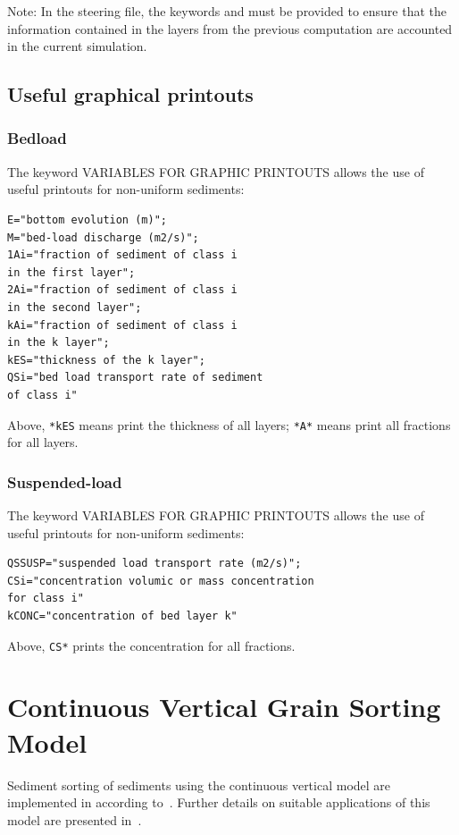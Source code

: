 \begin{WarningBlock}{Note:}
In the \sisyphe steering file, the keywords  and  must be provided
to ensure that the information contained in the layers from the previous computation are accounted in the current simulation.
\end{WarningBlock}
  


\subsection{Useful graphical printouts}
\subsubsection{Bedload}
The keyword {\ttfamily VARIABLES FOR GRAPHIC PRINTOUTS} allows the use of useful printouts for non-uniform sediments:
\begin{lstlisting}[frame=trBL]   
E="bottom evolution (m)";
M="bed-load discharge (m2/s)";
1Ai="fraction of sediment of class i 
in the first layer";
2Ai="fraction of sediment of class i 
in the second layer";
kAi="fraction of sediment of class i 
in the k layer";
kES="thickness of the k layer";
QSi="bed load transport rate of sediment 
of class i"
\end{lstlisting}
Above, \texttt{*kES} means print the thickness of all layers; \texttt{*A*} means print all fractions for all layers.

\subsubsection{Suspended-load}
The keyword {\ttfamily VARIABLES FOR GRAPHIC PRINTOUTS} allows the use of useful printouts for non-uniform sediments:
\begin{lstlisting}[frame=trBL]   
QSSUSP="suspended load transport rate (m2/s)";
CSi="concentration volumic or mass concentration 
for class i"
kCONC="concentration of bed layer k"
\end{lstlisting}
Above, \texttt{CS*} prints the concentration for all fractions.


\section{Continuous Vertical Grain Sorting Model}
Sediment sorting of sediments using the continuous vertical model are implemented in \sisyphe{} according to~\cite{Merkeletal2012}. Further details on suitable applications of this model are presented in~\cite{Merkel2017}.
